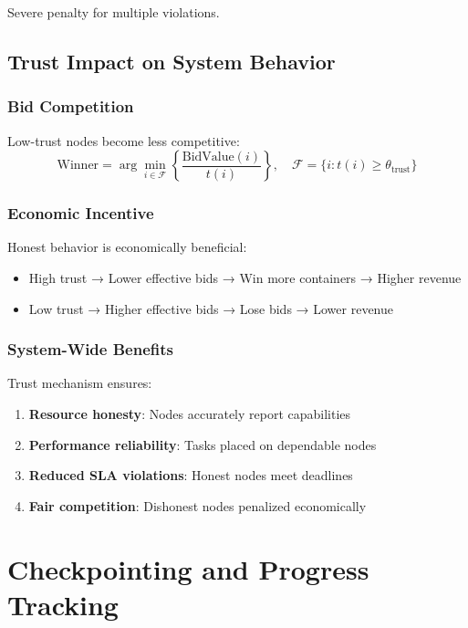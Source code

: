 \documentclass[12pt,a4paper]{article}
\begin{document}
Severe penalty for multiple violations.

\subsection{Trust Impact on System Behavior}

\subsubsection{Bid Competition}

Low-trust nodes become less competitive:
\begin{equation}
    \text{Winner} = \arg\min_{i \in \mathcal{F}} \left\{ \frac{\text{BidValue}(i)}{t(i)} \right\}, \quad \mathcal{F} = \{i : t(i) \geq \theta_{\text{trust}}\}
\end{equation}

\subsubsection{Economic Incentive}

Honest behavior is economically beneficial:
\begin{itemize}
    \item High trust → Lower effective bids → Win more containers → Higher revenue
    \item Low trust → Higher effective bids → Lose bids → Lower revenue
\end{itemize}

\subsubsection{System-Wide Benefits}

Trust mechanism ensures:
\begin{enumerate}
    \item \textbf{Resource honesty}: Nodes accurately report capabilities
    \item \textbf{Performance reliability}: Tasks placed on dependable nodes
    \item \textbf{Reduced SLA violations}: Honest nodes meet deadlines
    \item \textbf{Fair competition}: Dishonest nodes penalized economically
\end{enumerate}

\section{Checkpointing and Progress Tracking}
\end{document}
